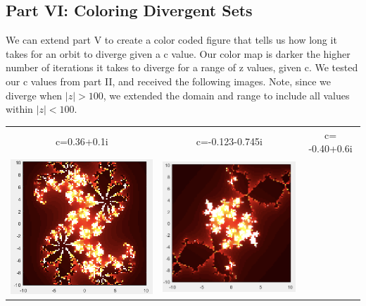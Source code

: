 \documentclass[11pt]{article}
\theoremstyle{plain}
\theoremstyle{definition}
\begin{document}
\subsection*{Part VI: Coloring Divergent Sets }
We can extend part V to create a color coded figure that tells us how long it takes for an orbit to diverge given a c value. Our color map is darker the higher number of iterations it takes to diverge for a range of z values, given c. We tested our c values from part II, and received the following images. Note, since we diverge when $| z|>100 $, we extended the domain and range to include all values within $ |z|<100 $. \\

\begin{tabular}{c c c}
	c=0.36+0.1i                                  &c=-0.123-0.745i                         &c= -0.40+0.6i\\
	\includegraphics*[scale = 0.3]{Plot6.png} 
	& \includegraphics*[scale = 0.3]{Plot7.png} 

\end{tabular}
\end{document}
